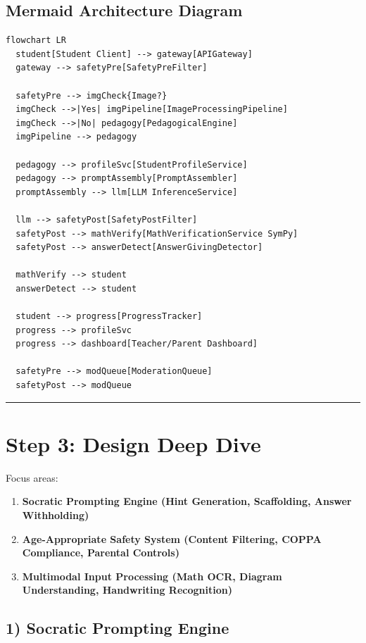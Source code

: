 \subsection*{Mermaid Architecture Diagram}

\begin{verbatim}
flowchart LR
  student[Student Client] --> gateway[APIGateway]
  gateway --> safetyPre[SafetyPreFilter]

  safetyPre --> imgCheck{Image?}
  imgCheck -->|Yes| imgPipeline[ImageProcessingPipeline]
  imgCheck -->|No| pedagogy[PedagogicalEngine]
  imgPipeline --> pedagogy

  pedagogy --> profileSvc[StudentProfileService]
  pedagogy --> promptAssembly[PromptAssembler]
  promptAssembly --> llm[LLM InferenceService]

  llm --> safetyPost[SafetyPostFilter]
  safetyPost --> mathVerify[MathVerificationService SymPy]
  safetyPost --> answerDetect[AnswerGivingDetector]

  mathVerify --> student
  answerDetect --> student

  student --> progress[ProgressTracker]
  progress --> profileSvc
  progress --> dashboard[Teacher/Parent Dashboard]

  safetyPre --> modQueue[ModerationQueue]
  safetyPost --> modQueue
\end{verbatim}

\bigskip\hrule\bigskip

\section*{Step 3: Design Deep Dive}

Focus areas:

\begin{enumerate}
  \item \textbf{Socratic Prompting Engine (Hint Generation, Scaffolding, Answer Withholding)}
  \item \textbf{Age-Appropriate Safety System (Content Filtering, COPPA Compliance, Parental Controls)}
  \item \textbf{Multimodal Input Processing (Math OCR, Diagram Understanding, Handwriting Recognition)}
\end{enumerate}

\subsection*{1) Socratic Prompting Engine}


